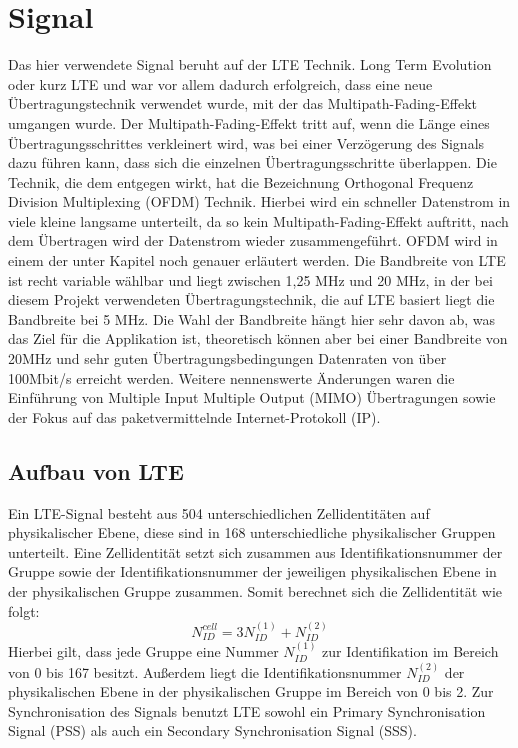 \section{Signal}
Das hier verwendete Signal beruht auf der LTE Technik. Long Term Evolution oder kurz LTE und war vor allem dadurch erfolgreich, dass eine neue Übertragungstechnik verwendet wurde, mit der das Multipath-Fading-Effekt umgangen wurde. Der Multipath-Fading-Effekt tritt auf, wenn die Länge eines Übertragungsschrittes verkleinert wird, was bei einer Verzögerung des Signals dazu führen kann, dass sich die einzelnen Übertragungsschritte überlappen. Die Technik, die dem entgegen wirkt, hat die Bezeichnung Orthogonal Frequenz Division Multiplexing (OFDM) Technik. Hierbei wird ein schneller Datenstrom in viele kleine langsame unterteilt, da so kein Multipath-Fading-Effekt auftritt, nach dem Übertragen wird der Datenstrom wieder zusammengeführt. OFDM wird in einem der unter Kapitel noch genauer erläutert werden. Die Bandbreite von LTE ist recht variable wählbar und liegt zwischen 1,25 MHz und 20 MHz, in der bei diesem Projekt verwendeten Übertragungstechnik, die auf LTE basiert liegt die Bandbreite bei 5 MHz. Die Wahl der Bandbreite hängt hier sehr davon ab, was das Ziel für die Applikation ist, theoretisch können aber bei einer Bandbreite von 20MHz und sehr guten Übertragungsbedingungen Datenraten von über 100Mbit/s erreicht werden. Weitere nennenswerte Änderungen waren die Einführung von Multiple Input Multiple Output (MIMO) Übertragungen sowie der Fokus auf das paketvermittelnde Internet-Protokoll (IP).~\cite[S.205f]{Sauter2018}

\subsection{Aufbau von LTE}
Ein LTE-Signal besteht aus 504 unterschiedlichen Zellidentitäten auf physikalischer Ebene, diese sind in 168 unterschiedliche physikalischer Gruppen unterteilt. Eine Zellidentität setzt sich zusammen aus Identifikationsnummer der Gruppe sowie der Identifikationsnummer der jeweiligen physikalischen Ebene in der physikalischen Gruppe zusammen. Somit berechnet sich die Zellidentität wie folgt:
\begin{equation}
    N_{ID}^{cell}=3N_{ID}^{(1)}+N_{ID}^{(2)}
\end{equation} 
Hierbei gilt, dass jede Gruppe eine Nummer $N_{ID}^{(1)}$ zur Identifikation im Bereich von 0 bis 167 besitzt. Außerdem liegt die Identifikationsnummer $N_{ID}^{(2)}$ der physikalischen Ebene in der physikalischen Gruppe im Bereich von 0 bis 2.
Zur Synchronisation des Signals benutzt LTE sowohl ein Primary Synchronisation Signal (PSS) als auch ein Secondary Synchronisation Signal (SSS).~\cite[S.~180]{etsi2021136}

